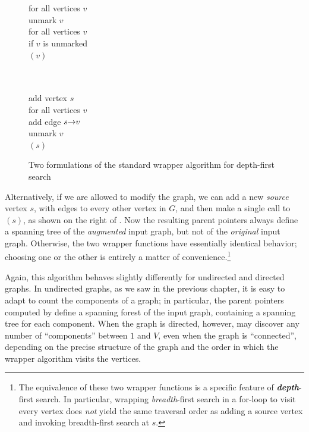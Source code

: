 \begin{figure}[ht]
\centering
\begin{minipage}[c]{0.47\linewidth}
\begin{pseudocode}
\\
\\
for all vertices $v$\\
\Indent unmark $v$\\
for all vertices $v$\\
\Indent if $v$ is unmarked\\
\Indent\Indent {}$(v)$
\end{pseudocode}
\end{minipage}\hfill
\begin{minipage}[c]{0.47\linewidth}
\begin{pseudocode}
\\
\\
add vertex $s$\\
for all vertices $v$\\
\Indent add edge $s\mathord{\rightarrow}v$\\
\Indent unmark $v$\\
$(s)$
\end{pseudocode}
\end{minipage}
\caption{Two formulations of the standard wrapper algorithm for depth-first search}
\label{fig:6.2}
\end{figure}

Alternatively, if we are allowed to modify the graph, we can add a new \textit{source} vertex $s$, with edges to every other vertex in $G$, and then make a single call to $(s)$, as shown on the right of .
Now the resulting parent pointers always define a spanning tree of the \textit{augmented} input graph, but not of the \textit{original} input graph.
Otherwise, the two wrapper functions have essentially identical behavior; choosing one or the other is entirely a matter of convenience.\footnote{The equivalence of these two wrapper functions is a specific feature of \textbf{\textit{depth}}-first search. In particular, wrapping \textit{breadth}-first search in a for-loop to visit every vertex does \textit{not} yield the same traversal order as adding a source vertex and invoking breadth-first search at $s$.}

Again, this algorithm behaves slightly differently for undirected and directed graphs.
In undirected graphs, as we saw in the previous chapter, it is easy to adapt  to count the components of a graph; in particular, the parent pointers computed by  define a spanning forest of the input graph, containing a spanning tree for each component.
When the graph is directed, however,  may discover any number of “components” between $1$ and $V$, even when the graph is “connected”, depending on the precise structure of the graph and the order in which the wrapper algorithm visits the vertices.

